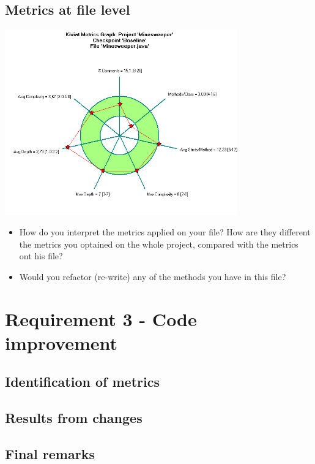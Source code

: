 \documentclass[UKenglish]{article}  %
\begin{document}
\subsection{Metrics at file level}
\includegraphics[height=8cm]{kiviat_diagram_minesweeper}
\begin{itemize}
\item How do you interpret the metrics applied on your file? How are they different the metrics you optained on the whole project, compared with the metrics ont his file?\\
\item Would you refactor (re-write) any of the methods you have in this file?
\end{itemize}
\section{Requirement 3 - Code improvement}

\subsection{Identification of metrics}

\subsection{Results from changes}

\subsection{Final remarks}
\end{document}
